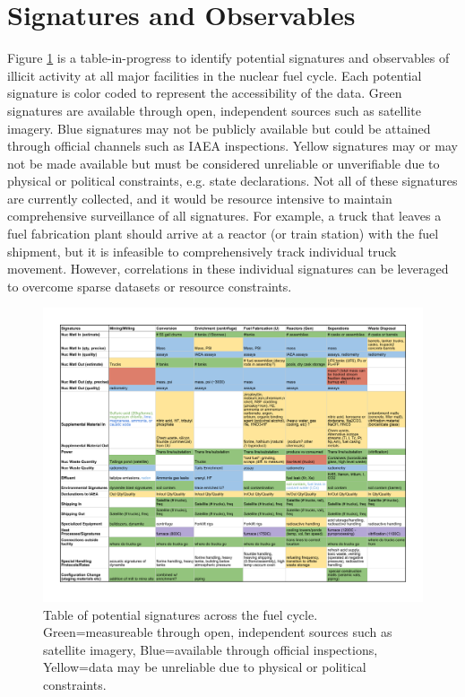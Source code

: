 \section{Signatures and Observables}
\label{s_signatures}



Figure \ref{fig:signatures} is a table-in-progress to identify potential signatures and observables of illicit activity at all major facilities in the nuclear fuel cycle.  Each potential signature is color coded to represent the accessibility of the data.  Green signatures are available through open, independent sources such as satellite imagery.  Blue signatures may not be publicly available but could be attained through official channels such as IAEA inspections.  Yellow signatures may or may not be made available but must be considered unreliable or unverifiable due to physical or political constraints, e.g. state declarations.  Not all of these signatures are currently collected, and it would be resource intensive to maintain comprehensive surveillance of all signatures.  For example, a truck that leaves a fuel fabrication plant should arrive at a reactor (or train station) with the fuel shipment, but it is infeasible to comprehensively track individual truck movement.  However, correlations in these individual signatures can be leveraged to overcome sparse datasets or resource constraints.


\begin{figure}%
\begin{center}
\includegraphics[natwidth=162bp,natheight=227bp, scale=0.6]{./figs/signatures_table.pdf}
\end{center}
\caption{Table of potential signatures across the fuel cycle. Green=measureable through open, independent sources such as satellite imagery, Blue=available through official inspections, Yellow=data may be unreliable due to physical or political constraints.}
\label{fig:signatures}
\end{figure}


